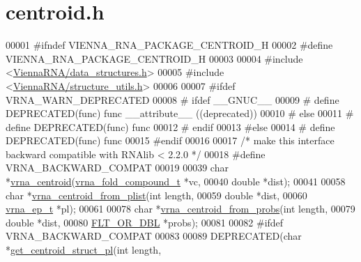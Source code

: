 \hypertarget{centroid_8h_source}{}\section{centroid.\+h}
\label{centroid_8h_source}

\begin{DoxyCode}
00001 \textcolor{preprocessor}{#ifndef VIENNA\_RNA\_PACKAGE\_CENTROID\_H}
00002 \textcolor{preprocessor}{#define VIENNA\_RNA\_PACKAGE\_CENTROID\_H}
00003 
00004 \textcolor{preprocessor}{#include <\hyperlink{data__structures_8h}{ViennaRNA/data\_structures.h}>}
00005 \textcolor{preprocessor}{#include <\hyperlink{structure__utils_8h}{ViennaRNA/structure\_utils.h}>}
00006 
00007 \textcolor{preprocessor}{#ifdef VRNA\_WARN\_DEPRECATED}
00008 \textcolor{preprocessor}{# ifdef \_\_GNUC\_\_}
00009 \textcolor{preprocessor}{#  define DEPRECATED(func) func \_\_attribute\_\_ ((deprecated))}
00010 \textcolor{preprocessor}{# else}
00011 \textcolor{preprocessor}{#  define DEPRECATED(func) func}
00012 \textcolor{preprocessor}{# endif}
00013 \textcolor{preprocessor}{#else}
00014 \textcolor{preprocessor}{# define DEPRECATED(func) func}
00015 \textcolor{preprocessor}{#endif}
00016 
00017 \textcolor{comment}{/* make this interface backward compatible with RNAlib < 2.2.0 */}
00018 \textcolor{preprocessor}{#define VRNA\_BACKWARD\_COMPAT}
00019 
00039 \textcolor{keywordtype}{char} *\hyperlink{group__centroid__fold_ga0e64bb67e51963dc71cbd4d30b80a018}{vrna\_centroid}(\hyperlink{group__fold__compound_structvrna__fc__s}{vrna\_fold\_compound\_t} *vc,
00040                     \textcolor{keywordtype}{double} *dist);
00041 
00058 \textcolor{keywordtype}{char}  *\hyperlink{group__centroid__fold_ga13881673a0b214d42a59140ef5764dbb}{vrna\_centroid\_from\_plist}(\textcolor{keywordtype}{int} length,
00059                                 \textcolor{keywordtype}{double} *dist,
00060                                 \hyperlink{group__struct__utils_structvrna__elem__prob__s}{vrna\_ep\_t} *pl);
00061 
00078 \textcolor{keywordtype}{char}  *\hyperlink{group__centroid__fold_ga98193ede06778a9ea966cc8fc43d0804}{vrna\_centroid\_from\_probs}(\textcolor{keywordtype}{int} length,
00079                                 \textcolor{keywordtype}{double} *dist,
00080                                 \hyperlink{group__data__structures_ga31125aeace516926bf7f251f759b6126}{FLT\_OR\_DBL} *probs);
00081 
00082 \textcolor{preprocessor}{#ifdef VRNA\_BACKWARD\_COMPAT}
00083 
00089 DEPRECATED(\textcolor{keywordtype}{char}  *\hyperlink{centroid_8h_a7dcc64bcefcf682396dd3bbea02416fe}{get\_centroid\_struct\_pl}(\textcolor{keywordtype}{int} length,

\end{DoxyCode}
